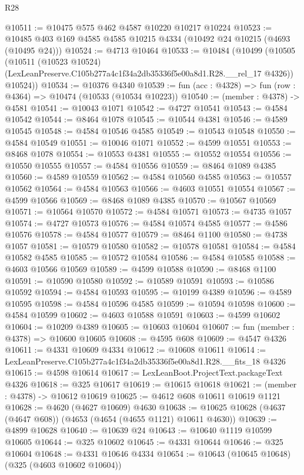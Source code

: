 \begin{lexlean}{R28}
\begin{coremodule}
@10511 := @10475 @575 @462 @4587 @10220 @10217 @10224
@10523 := @10485 @403 @169 @4585 @4585 @10215 @4334 (@10492 @24 @10215 (@4693 (@10495 @24)))
@10524 := @4713 @10464
@10533 := @10484
    (@10499
      (@10505
        (@10511
          (@10523 @10524)
          (LexLeanPreserve.C105b277a4c1f34a2db35336f5e00a8d1.R28.__rel_17 @4326))
        @10524))
@10534 := @10376 @4340
@10539 := fun (acc : @4328) => fun (row : @4364) => @10474 (@10533 (@10534 @10223))
@10540 := (member : @4378) -> @4581
@10541 := @10043 @1071
@10542 := @4727 @10541
@10543 := @4584 @10542
@10544 := @8464 @1078
@10545 := @10544 @4381
@10546 := @4589 @10545
@10548 := @4584 @10546 @4585
@10549 := @10543 @10548
@10550 := @4584 @10549
@10551 := @10046 @1071
@10552 := @4599 @10551
@10553 := @8468 @1078
@10554 := @10553 @4381
@10555 := @10552 @10554
@10556 := @10550 @10555
@10557 := @4584 @10556
@10559 := @8464 @1089 @4385
@10560 := @4589 @10559
@10562 := @4584 @10560 @4585
@10563 := @10557 @10562
@10564 := @4584 @10563
@10566 := @4603 @10551 @10554
@10567 := @4599 @10566
@10569 := @8468 @1089 @4385
@10570 := @10567 @10569
@10571 := @10564 @10570
@10572 := @4584 @10571
@10573 := @4735 @1057
@10574 := @4727 @10573
@10576 := @4584 @10574 @4585
@10577 := @4586 @10576
@10578 := @4584 @10577
@10579 := @8464 @1100
@10580 := @4738 @1057
@10581 := @10579 @10580
@10582 := @10578 @10581
@10584 := @4584 @10582 @4585
@10585 := @10572 @10584
@10586 := @4584 @10585
@10588 := @4603 @10566 @10569
@10589 := @4599 @10588
@10590 := @8468 @1100
@10591 := @10590 @10580
@10592 := @10589 @10591
@10593 := @10586 @10592
@10594 := @4584 @10593
@10595 := @10199 @4389
@10596 := @4589 @10595
@10598 := @4584 @10596 @4585
@10599 := @10594 @10598
@10600 := @4584 @10599
@10602 := @4603 @10588 @10591
@10603 := @4599 @10602
@10604 := @10209 @4389
@10605 := @10603 @10604
@10607 := fun (member : @4378) => @10600 @10605
@10608 := @4595 @608
@10609 := @4547 @4326
@10611 := @4331 @10609 @4334
@10612 := @10608 @10611
@10614 := LexLeanPreserve.C105b277a4c1f34a2db35336f5e00a8d1.R28.__fits_18 @4326
@10615 := @4598 @10614
@10617 := LexLeanBoot.ProjectText.packageText @4326
@10618 := @325 @10617
@10619 := @10615 @10618
@10621 := (member : @4378) -> @10612 @10619
@10625 := @4612 @608 @10611 @10619 @1121
@10628 := @4620 (@4627 @10609) @4630
@10638 := @10625 @10628 (@4637 (@4647 @608)) (@4653 (@4654 (@4655 @1121) @10611 @4630))
@10639 := @4899 @10628
@10640 := @10639 @24
@10643 := @10640 @1119 @10599 @10605
@10644 := @325 @10602
@10645 := @4331 @10644
@10646 := @325 @10604
@10648 := @4331 @10646 @4334
@10654 := @10643 (@10645 @10648) (@325 (@4603 @10602 @10604))

\end{coremodule}
\end{lexlean}
